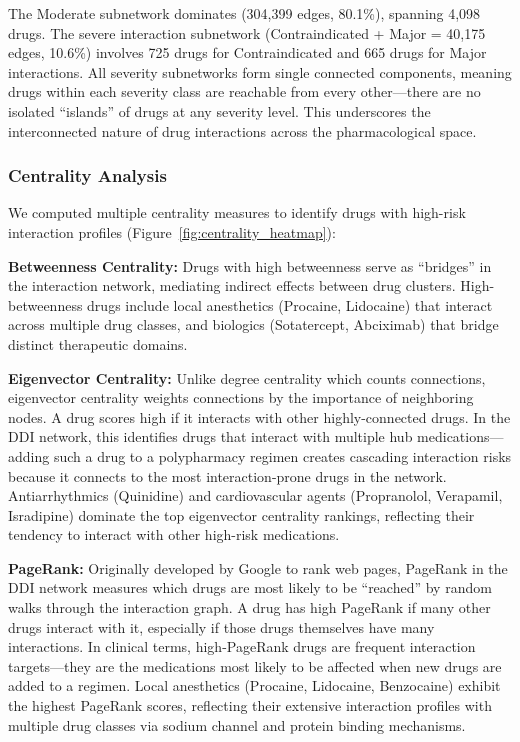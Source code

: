 \documentclass[11pt,a4paper]{article}
\begin{document}
The Moderate subnetwork dominates (304,399 edges, 80.1\%), spanning 4,098 drugs. The severe interaction subnetwork (Contraindicated + Major = 40,175 edges, 10.6\%) involves 725 drugs for Contraindicated and 665 drugs for Major interactions. All severity subnetworks form single connected components, meaning drugs within each severity class are reachable from every other---there are no isolated ``islands'' of drugs at any severity level. This underscores the interconnected nature of drug interactions across the pharmacological space.

\subsubsection*{Centrality Analysis}

We computed multiple centrality measures to identify drugs with high-risk interaction profiles (Figure~\ref{fig:centrality_heatmap}):

\textbf{Betweenness Centrality:} Drugs with high betweenness serve as ``bridges'' in the interaction network, mediating indirect effects between drug clusters. High-betweenness drugs include local anesthetics (Procaine, Lidocaine) that interact across multiple drug classes, and biologics (Sotatercept, Abciximab) that bridge distinct therapeutic domains.

\textbf{Eigenvector Centrality:} Unlike degree centrality which counts connections, eigenvector centrality weights connections by the importance of neighboring nodes. A drug scores high if it interacts with other highly-connected drugs. In the DDI network, this identifies drugs that interact with multiple hub medications---adding such a drug to a polypharmacy regimen creates cascading interaction risks because it connects to the most interaction-prone drugs in the network. Antiarrhythmics (Quinidine) and cardiovascular agents (Propranolol, Verapamil, Isradipine) dominate the top eigenvector centrality rankings, reflecting their tendency to interact with other high-risk medications.

\textbf{PageRank:} Originally developed by Google to rank web pages, PageRank in the DDI network measures which drugs are most likely to be ``reached'' by random walks through the interaction graph. A drug has high PageRank if many other drugs interact with it, especially if those drugs themselves have many interactions. In clinical terms, high-PageRank drugs are frequent interaction targets---they are the medications most likely to be affected when new drugs are added to a regimen. Local anesthetics (Procaine, Lidocaine, Benzocaine) exhibit the highest PageRank scores, reflecting their extensive interaction profiles with multiple drug classes via sodium channel and protein binding mechanisms.
\end{document}
